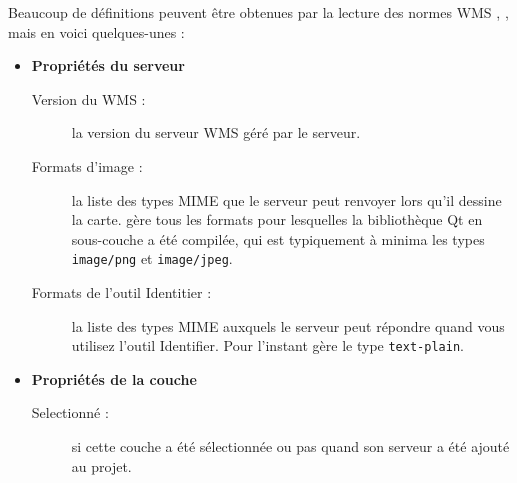 Beaucoup de définitions peuvent être obtenues par la lecture des normes WMS
\parencite{OGCWMS010101web}, \parencite{OGCWMS010300web}, mais en voici quelques-unes :

\begin{itemize}[label=--]
\item \textbf{Propriétés du serveur}

\begin{description}
\item[Version du WMS :]  la version du serveur WMS géré par le
serveur.

\item[Formats d'image :]  la liste des types MIME que le serveur peut
renvoyer lors qu'il dessine la carte. \qg gère tous les formats pour
lesquelles la bibliothèque Qt en sous-couche a été compilée, qui est
typiquement à minima les types \texttt{image/png} et \texttt{image/jpeg}.

\item[Formats de l'outil Identitier :]  la liste des types
MIME auxquels le serveur peut répondre quand vous utilisez l'outil
Identifier. Pour l'instant \qg gère le type \texttt{text-plain}.
\end{description}

\item \textbf{Propriétés de la couche}

\begin{description}
\item[Selectionné :]  si cette couche a été sélectionnée ou pas
quand son serveur a été ajouté au projet.


\end{description}
\end{itemize}
